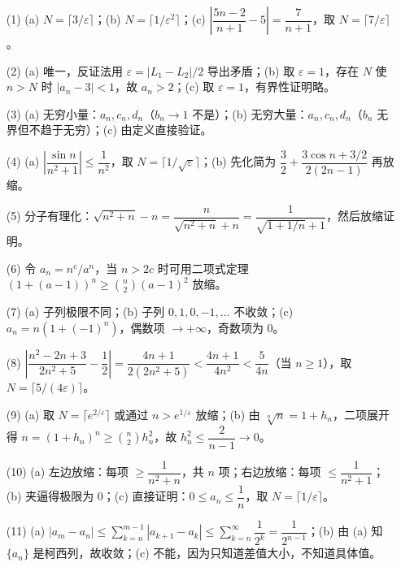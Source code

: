 \documentclass[fontset=fandol]{ctexart}
\begin{document}
\begin{enumerate}
\item[(1)] 
   (a) \(N = \lceil 3/\varepsilon \rceil\)；(b) \(N = \lceil 1/\varepsilon^2 \rceil\)；(c) \(\left|\dfrac{5n-2}{n+1} - 5\right| = \dfrac{7}{n+1}\)，取 \(N = \lceil 7/\varepsilon \rceil\)。

\item[(2)] 
   (a) 唯一，反证法用 \(\varepsilon = |L_1 - L_2|/2\) 导出矛盾；(b) 取 \(\varepsilon = 1\)，存在 \(N\) 使 \(n > N\) 时 \(|a_n-3|<1\)，故 \(a_n > 2\)；(c) 取 \(\varepsilon=1\)，有界性证明略。

\item[(3)] 
   (a) 无穷小量：\(a_n, c_n, d_n\)（\(b_n \to 1\) 不是）；(b) 无穷大量：\(a_n, c_n, d_n\)（\(b_n\) 无界但不趋于无穷）；(c) 由定义直接验证。

\item[(4)] 
   (a) \(\left|\dfrac{\sin n}{n^2+1}\right| \leq \dfrac{1}{n^2}\)，取 \(N = \lceil 1/\sqrt{\varepsilon} \rceil\)；(b) 先化简为 \(\dfrac{3}{2} + \dfrac{3\cos n + 3/2}{2(2n-1)}\) 再放缩。

\item[(5)] 
   分子有理化：\(\sqrt{n^2+n} - n = \dfrac{n}{\sqrt{n^2+n}+n} = \dfrac{1}{\sqrt{1+1/n}+1}\)，然后放缩证明。

\item[(6)] 
   令 \(a_n = n^c / a^n\)，当 \(n > 2c\) 时可用二项式定理 \((1+(a-1))^n \geq \binom{n}{2}(a-1)^2\) 放缩。

\item[(7)] 
   (a) 子列极限不同；(b) 子列 \(0,1,0,-1,\dots\) 不收敛；(c) \(a_n = n(1+(-1)^n)\)，偶数项 \(\to +\infty\)，奇数项为 0。

\item[(8)] 
   \(\left|\dfrac{n^2-2n+3}{2n^2+5} - \dfrac{1}{2}\right| = \dfrac{4n+1}{2(2n^2+5)} < \dfrac{4n+1}{4n^2} < \dfrac{5}{4n}\)（当 \(n \geq 1\)），取 \(N = \lceil 5/(4\varepsilon) \rceil\)。

\item[(9)] 
   (a) 取 \(N = \lceil e^{2/\varepsilon} \rceil\) 或通过 \(n > e^{1/\varepsilon}\) 放缩；(b) 由 \(\sqrt[n]{n} = 1+h_n\)，二项展开得 \(n = (1+h_n)^n \geq \binom{n}{2}h_n^2\)，故 \(h_n^2 \leq \dfrac{2}{n-1} \to 0\)。

\item[(10)] 
   (a) 左边放缩：每项 \(\geq \dfrac{1}{n^2+n}\)，共 \(n\) 项；右边放缩：每项 \(\leq \dfrac{1}{n^2+1}\)；(b) 夹逼得极限为 0；(c) 直接证明：\(0 \leq a_n \leq \dfrac{1}{n}\)，取 \(N = \lceil 1/\varepsilon \rceil\)。

\item[(11)] 
   (a) \(|a_m - a_n| \leq \sum_{k=n}^{m-1} |a_{k+1}-a_k| \leq \sum_{k=n}^{\infty} \dfrac{1}{2^k} = \dfrac{1}{2^{n-1}}\)；(b) 由 (a) 知 \(\{a_n\}\) 是柯西列，故收敛；(c) 不能，因为只知道差值大小，不知道具体值。
\end{enumerate}
\end{document}

